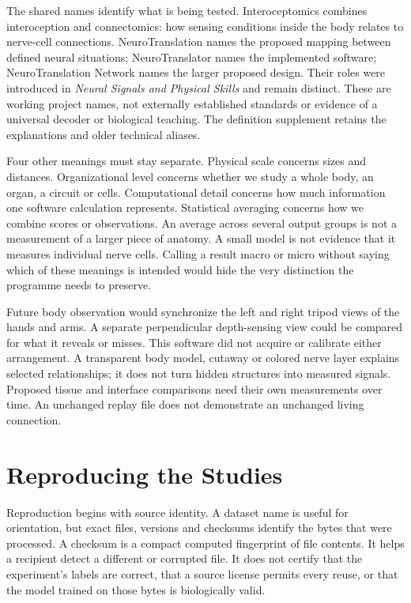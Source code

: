 The shared names identify what is being tested. Interoceptomics combines
interoception and connectomics: how sensing conditions inside the body relates
to nerve-cell connections. NeuroTranslation names the proposed mapping between
defined neural situations; NeuroTranslator names the implemented software;
NeuroTranslation Network names the larger proposed design. Their roles were
introduced in \emph{Neural Signals and Physical Skills} and remain distinct.
These are working project names, not externally established standards or
evidence of a universal decoder or biological teaching. The definition
supplement retains the explanations and older technical aliases.

Four other meanings must stay separate. Physical scale concerns sizes and distances. Organizational level concerns whether we study a whole body, an organ, a circuit or cells. Computational detail concerns how much information one software calculation represents. Statistical averaging concerns how we combine scores or observations. An average across several output groups is not a measurement of a larger piece of anatomy. A small model is not evidence that it measures individual nerve cells. Calling a result macro or micro without saying which of these meanings is intended would hide the very distinction the programme needs to preserve.

Future body observation would synchronize the left and right tripod views of the hands and arms. A separate perpendicular depth-sensing view could be compared for what it reveals or misses. This software did not acquire or calibrate either arrangement. A transparent body model, cutaway or colored nerve layer explains selected relationships; it does not turn hidden structures into measured signals. Proposed tissue and interface comparisons need their own measurements over time. An unchanged replay file does not demonstrate an unchanged living connection.

\section{Reproducing the Studies}

Reproduction begins with source identity. A dataset name is useful for orientation, but exact files, versions and checksums identify the bytes that were processed. A checksum is a compact computed fingerprint of file contents. It helps a recipient detect a different or corrupted file. It does not certify that the experiment's labels are correct, that a source license permits every reuse, or that the model trained on those bytes is biologically valid.

